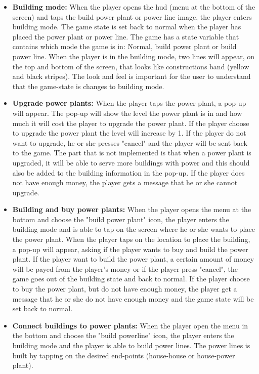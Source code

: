 	\begin{itemize}
		\item {\bf Building mode:} When the player opens the hud (menu at the bottom of the screen) and taps
		the build power plant or power line image, the player enters building mode. The game state is set back to normal when the player has placed the power plant or power line. The game has a state variable that contains which mode the game is in: Normal, build power plant or build power line. When the player is in the building
		mode, two lines will appear, on the top and bottom of the screen, that looks like constructions band
		(yellow and black stripes). The look and feel is important for the user to understand that
		the game-state is changes to building mode. 

		\item {\bf Upgrade power plants:} When the player taps the power plant, a pop-up will appear.
		The pop-up will show the level the power plant is in and how much it will cost the 
		player to upgrade the power plant. If the player choose to upgrade the power plant the level will
		increase by 1. If the player do not want to upgrade, he or she presses "cancel" and the player will be sent
		back to the game. The part that is not implemented is that when a power plant is upgraded, 
		it will be able to serve more buildings with power and this should also be added to the building 
		information in the pop-up. If the player does not have enough money, the player gets a message 
		that he or she cannot upgrade.

		\item {\bf Building and buy power plants:} When the player opens the menu at the bottom and 
		choose the "build power plant" icon, the player enters the building mode and is able to 
		tap on the screen where he or she wants to place the power plant. When the player taps on the
		location to place the building, a pop-up will appear, asking if the player 
		wants to buy and build the power plant. If the player want to build the power plant, a certain
		amount of money will be payed from the player's money or if the player press "cancel", the 
		game goes out of the building state and back to normal. If the player choose to buy the 
		power plant, but do not have enough money, the player get a message that he or she do not have
		enough money and the game state will be set back to normal. 

		\item {\bf Connect buildings to power plants:} When the player open the menu in the bottom and 
		choose the "build powerline" icon, the player enters the building mode and the player is able
		to build power lines. The power lines is built by tapping on the desired end-points (house-house 
		or house-power plant).


\end{itemize}
